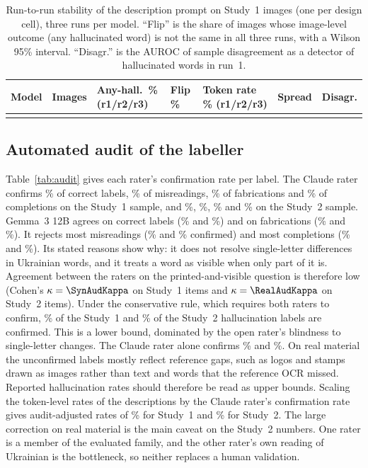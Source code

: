 \begin{table}[!tbp]
\caption{Run-to-run stability of the description prompt on \StabN{} Study~1 images (one per design cell), three runs per model. ``Flip'' is the share of images whose image-level outcome (any hallucinated word) is not the same in all three runs, with a Wilson 95\% interval. ``Disagr.'' is the AUROC of sample disagreement as a detector of hallucinated words in run~1.}\label{tab:stab}
\footnotesize
\begin{tabular*}{\textwidth}{@{\extracolsep\fill}lrlllrr}
\toprule
Model & Images & Any-hall.\ \% (r1/r2/r3) & Flip \% & Token rate \% (r1/r2/r3) & Spread & Disagr. \\
\midrule
\botrule
\end{tabular*}
\end{table}

\subsection{Automated audit of the labeller}\label{sec:audit_res}

Table~\ref{tab:audit} gives each rater's confirmation rate per label. The Claude rater confirms \SynAudCorrCl\% of correct labels, \SynAudMisCl\% of misreadings, \SynAudFabCl\% of fabrications and \SynAudComplCl\% of completions on the Study~1 sample, and \RealAudCorrCl\%, \RealAudMisCl\%, \RealAudFabCl\% and \RealAudComplCl\% on the Study~2 sample. Gemma~3 12B agrees on correct labels (\SynAudCorrGm\% and \RealAudCorrGm\%) and on fabrications (\SynAudFabGm\% and \RealAudFabGm\%). It rejects most misreadings (\SynAudMisGm\% and \RealAudMisGm\% confirmed) and most completions (\SynAudComplGm\% and \RealAudComplGm\%). Its stated reasons show why: it does not resolve single-letter differences in Ukrainian words, and it treats a word as visible when only part of it is. Agreement between the raters on the printed-and-visible question is therefore low (Cohen's $\kappa=\SynAudKappa$ on \SynAudNBoth{} Study~1 items and $\kappa=\RealAudKappa$ on \RealAudNBoth{} Study~2 items). Under the conservative rule, which requires both raters to confirm, \SynAudHall\% of the Study~1 and \RealAudHall\% of the Study~2 hallucination labels are confirmed. This is a lower bound, dominated by the open rater's blindness to single-letter changes. The Claude rater alone confirms \SynAudHallCl\% and \RealAudHallCl\%. On real material the unconfirmed labels mostly reflect reference gaps, such as logos and stamps drawn as images rather than text and words that the reference OCR missed. Reported hallucination rates should therefore be read as upper bounds. Scaling the token-level rates of the descriptions by the Claude rater's confirmation rate gives audit-adjusted rates of \SynAdjRange\% for Study~1 and \RealAdjRange\% for Study~2. The large correction on real material is the main caveat on the Study~2 numbers. One rater is a member of the evaluated family, and the other rater's own reading of Ukrainian is the bottleneck, so neither replaces a human validation.

